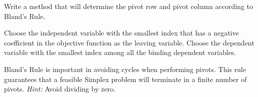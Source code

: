 \begin{problem}
Write a method that will determine the pivot row and pivot column according to Bland's Rule.
\begin{definition}
Choose the independent variable with the smallest index that has a negative coefficient in the objective function
as the leaving variable.
Choose the dependent variable with the smallest index among all the binding dependent variables.
\end{definition}

Bland's Rule is important in avoiding cycles when performing pivots.
This rule guarantees that a feasible Simplex problem will terminate in a finite number of pivots. \emph{Hint:} Avoid dividing by zero.
\label{prob:blands}
\end{problem}


